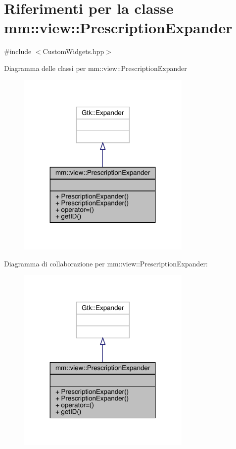 \hypertarget{classmm_1_1view_1_1_prescription_expander}{}\section{Riferimenti per la classe mm\+:\+:view\+:\+:Prescription\+Expander}
\label{classmm_1_1view_1_1_prescription_expander}


{\ttfamily \#include $<$Custom\+Widgets.\+hpp$>$}



Diagramma delle classi per mm\+:\+:view\+:\+:Prescription\+Expander\nopagebreak
\begin{figure}[H]
\begin{center}
\leavevmode
\includegraphics[width=239pt]{d8/d7b/classmm_1_1view_1_1_prescription_expander__inherit__graph}
\end{center}
\end{figure}


Diagramma di collaborazione per mm\+:\+:view\+:\+:Prescription\+Expander\+:\nopagebreak
\begin{figure}[H]
\begin{center}
\leavevmode
\includegraphics[width=239pt]{df/d9c/classmm_1_1view_1_1_prescription_expander__coll__graph}
\end{center}
\end{figure}
